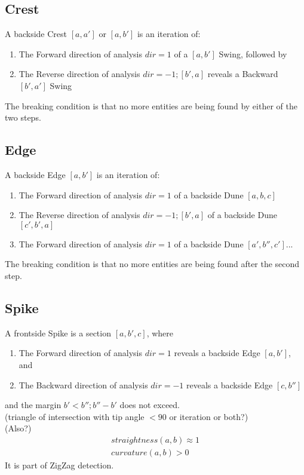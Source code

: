 \documentclass{report}
\begin{document}
\subsection{Crest}
A backside Crest $[a,a']$ or $[a,b']$ is an iteration of:
\begin{enumerate}
\item The Forward direction of analysis $dir=1$ of a $[a,b']$ Swing, followed by 
\item The Reverse direction of analysis $dir=-1;[b',a]$ reveals a Backward $[b',a']$ Swing
\end{enumerate}
The breaking condition is that no more entities are being found by either of the two steps.

\subsection{Edge}
A backside Edge $[a,b']$ is an iteration of:
\begin{enumerate}
\item The Forward direction of analysis $dir=1$ of a backside Dune $[a,b,c]$
\item The Reverse direction of analysis $dir=-1;[b',a]$ of a backside Dune $[c',b',a]$ 
\item The Forward direction of analysis $dir=1$ of a backside Dune $[a',b'',c']$...
\end{enumerate}
The breaking condition is that no more entities are being found after the second step.

\subsection{Spike}
A frontside Spike is a section $[a,b',c]$, where
\begin{enumerate}
\item The Forward direction of analysis $dir=1$ reveals a backside Edge $[a,b']$, and
\item The Backward direction of analysis $dir=-1$ reveals a backside Edge $[c,b'']$ 
\end{enumerate}
and the margin $b'<b'';b''-b'$ does not exceed.\\
(triangle of intersection with tip angle $<90$ or iteration or both?)\\
(Also?)
\begin{align}
straightness(a,b)\approx 1\\ curvature(a,b)>0
\end{align}
It is part of ZigZag detection.
\end{document}
